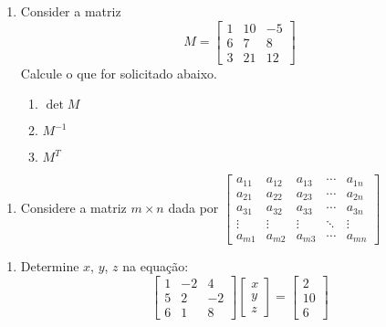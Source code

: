 \documentclass[a4paper,12pt]{article}
\begin{document}
   \begin{enumerate}
      \item Consider a matriz $$M= \begin{bmatrix}
      1&10& -5\\6&7&8\\3&21&12
      \end{bmatrix}$$Calcule o que for solicitado abaixo.
      \begin{enumerate}
         \item $\det M$
         \item $M^{-1}$
         \item $M^T$
      \end{enumerate}
   \end{enumerate}
   \begin{enumerate}
      \item Considere a matriz $m\times n$ dada por $\begin{bmatrix}
      a_{11} & a_{12} & a_{13} & \cdots & a_{1n} \\ a_{21} & a_{22} & a_{23} & \cdots & a_{2n} \\ a_{31} & a_{32} & a_{33} & \cdots & a_{3n} \\ \vdots & \vdots & \vdots & \ddots & \vdots \\ a_{m1} & a_{m2} & a_{m3} & \cdots & a_{mn}  
      \end{bmatrix}$
   \end{enumerate}
   \begin{enumerate}
      \item Determine $x$, $y$, $z$ na equação: $$\begin{bmatrix}
      1& -2&4\\5&2& -2\\ 6&1&8
      \end{bmatrix}
      \begin{bmatrix}
         x \\ y \\ z
      \end{bmatrix}=
      \begin{bmatrix}
        2\\ 10\\ 6
      \end{bmatrix}$$
   \end{enumerate}
   
\end{document}
